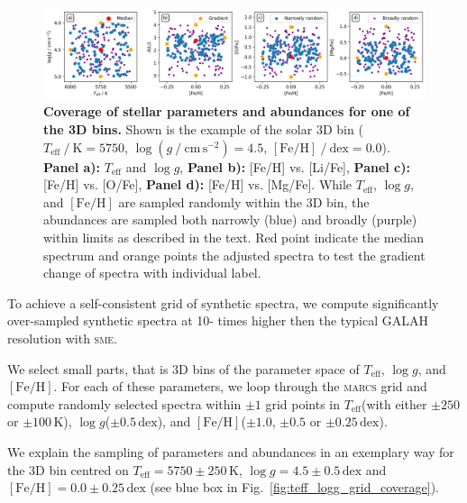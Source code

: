 \documentclass[
  journal=pasa,
  manuscript=research-paper, %
  year=2021,
  volume=37
]{cup-journal}
\newcommand{\Teff}{$T_\mathrm{eff}$\xspace}
\newcommand{\logg}{$\log g$\xspace}
\newcommand{\feh}{$\mathrm{[Fe/H]}$\xspace}
\newcommand{\sme}{\textsc{sme}\xspace}
\newcommand{\marcs}{\textsc{marcs}\xspace}
\newcommand{\dex}{\,\mathrm{dex}}	%
\newcommand{\K}{\,\mathrm{K}}	%
\begin{document}
\begin{figure}[h!]
 \centering
 \includegraphics[width=\textwidth]{figures/example_3d_bin_sample.png}
 \caption{\textbf{Coverage of stellar parameters and abundances for one of the 3D bins.} Shown is the example of the solar 3D bin ($T_\mathrm{eff}~/~\mathrm{K} = 5750$, $\log (g~/~\mathrm{cm\,s^{-2}}) = 4.5$, $\mathrm{[Fe/H]}~/~\mathrm{dex} = 0.0$). \textbf{Panel a):} \Teff and \logg, \textbf{Panel b):} [Fe/H] vs. [Li/Fe], \textbf{Panel c):} [Fe/H] vs. [O/Fe], \textbf{Panel d):} [Fe/H] vs. [Mg/Fe]. While \Teff, \logg, and \feh are sampled randomly within the 3D bin, the abundances are sampled both narrowly (blue) and broadly (purple) within limits as described in the text. Red point indicate the median spectrum and orange points the adjusted spectra to test the gradient change of spectra with individual label.}
 \label{fig:example_3d_bin_sample}
\end{figure}

To achieve a self-consistent grid of synthetic spectra, we compute significantly over-sampled synthetic spectra at 10- times higher then the typical GALAH resolution with \sme.

We select small parts, that is 3D bins of the parameter space of \Teff, \logg, and \feh. For each of these parameters, we loop through the \marcs grid and compute randomly selected spectra within $\pm 1$ grid points in \Teff (with either $\pm 250$ or $\pm 100\K$), \logg ($\pm 0.5\dex$), and \feh ($\pm 1.0$, $\pm 0.5$ or $\pm 0.25\dex $).

We explain the sampling of parameters and abundances in an exemplary way for the 3D bin centred on $T_\text{eff} = 5750\pm250\K$, $\log g = 4.5\pm0.5\dex$ and $\mathrm{[Fe/H]} = 0.0\pm0.25\dex$ (see blue box in Fig.~\ref{fig:teff_logg_grid_coverage}).
\end{document}
